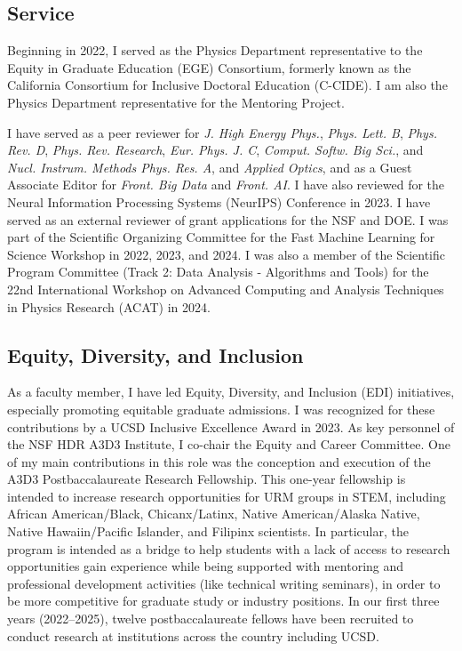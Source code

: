 \documentclass[11pt,letterpaper,notitlepage]{article}
\begin{document}
\vspace{-1ex}
\subsection*{Service}

Beginning in 2022, I served as the Physics Department representative to the Equity in Graduate Education (EGE) Consortium, formerly known as the California Consortium for Inclusive Doctoral Education (C-CIDE).
I am also the Physics Department representative for the Mentoring Project.

I have served as a peer reviewer for \emph{J. High Energy Phys.}, \emph{Phys. Lett. B}, \emph{Phys. Rev. D}, \emph{Phys. Rev. Research}, \emph{Eur. Phys. J. C}, \emph{Comput. Softw. Big Sci.}, and \emph{Nucl. Instrum. Methods Phys. Res. A}, and \emph{Applied Optics}, and as a Guest Associate Editor for \emph{Front. Big Data} and \emph{Front. AI}.
I have also reviewed for the Neural Information Processing Systems (NeurIPS) Conference in 2023.
I have served as an external reviewer of grant applications for the NSF and DOE.
I was part of the Scientific Organizing Committee for the Fast Machine Learning for Science Workshop in 2022, 2023, and 2024.
I was also a member of the Scientific Program Committee (Track 2: Data Analysis - Algorithms and Tools) for the 22nd International Workshop on Advanced Computing and Analysis Techniques in Physics Research (ACAT) in 2024.

\vspace{-1ex}
\subsection*{Equity, Diversity, and Inclusion}

As a faculty member, I have led Equity, Diversity, and Inclusion (EDI) initiatives, especially promoting equitable graduate admissions.
I was recognized for these contributions by a UCSD Inclusive Excellence Award in 2023.
As key personnel of the NSF HDR A3D3 Institute, I co-chair the Equity and Career Committee.
One of my main contributions in this role was the conception and execution of the A3D3 Postbaccalaureate Research Fellowship.
This one-year fellowship is intended to increase research opportunities for URM groups in STEM, including African American/Black, Chicanx/Latinx, Native American/Alaska Native, Native Hawaiin/Pacific Islander, and Filipinx scientists.
In particular, the program is intended as a bridge to help students with a lack of access to research opportunities gain experience while being supported with mentoring and professional development activities (like technical writing seminars), in order to be more competitive for graduate study or industry positions.
In our first three years (2022--2025), twelve postbaccalaureate fellows have been recruited to conduct research at institutions across the country including UCSD.
\end{document}
